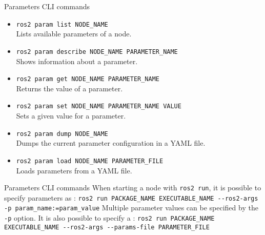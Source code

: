 \begin{frame}{Parameters CLI commands}
	\begin{itemize}
		\item \texttt{ros2 param list NODE\_NAME}\\Lists available parameters of a node.
		\item \texttt{ros2 param describe NODE\_NAME PARAMETER\_NAME}\\Shows information about a parameter.
		\item \texttt{ros2 param get NODE\_NAME PARAMETER\_NAME}\\Returns the value of a parameter.
		\item \texttt{ros2 param set NODE\_NAME PARAMETER\_NAME VALUE}\\Sets a given value for a parameter.
		\item \texttt{ros2 param dump NODE\_NAME}\\Dumps the current parameter configuration in a YAML file.
		\item \texttt{ros2 param load NODE\_NAME PARAMETER\_FILE}\\Loads parameters from a YAML file.
	\end{itemize}
\end{frame}
\begin{frame}{Parameters CLI commands}
  When starting a node with \texttt{ros2 run}, it is possible to specify parameters as :
  \newline\newline
  \texttt{ros2 run PACKAGE\_NAME EXECUTABLE\_NAME -{}-ros2-args -p param\_name:=param\_value}
  \newline\newline
  Multiple parameter values can be specified by  the \texttt{-p} option. It is also possible to specify a :
  \newline\newline
  \texttt{ros2 run PACKAGE\_NAME EXECUTABLE\_NAME -{}-ros2-args -{}-params-file PARAMETER\_FILE}
\end{frame}

